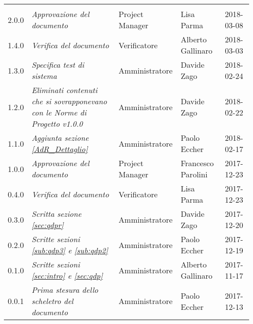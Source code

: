 \newpage 
\section*{}
\begin{table}[H]
	\centering
	\begin{tabular}{C{2cm}|C{4cm}|C{3cm}|C{3cm}|R{2cm}}
		
		 & & & & \\
		

		2.0.0 & \emph{Approvazione del documento} & Project Manager & Lisa Parma & 2018-03-08 \\
		\hline
		
		1.4.0 & \emph{Verifica del documento} & Verificatore &  Alberto Gallinaro & 2018-03-03\\
		\hline
		
		1.3.0 & \emph{Specifica test di sistema} & Amministratore &  Davide Zago & 2018-02-24 \\
		\hline
		
		1.2.0 & \emph{Eliminati contenuti che si sovrapponevano con le Norme di Progetto v1.0.0} & Amministratore &  Davide Zago & 2018-02-22 \\
		\hline
		
		1.1.0 & \emph{Aggiunta sezione \ref{AdR_Dettaglio}} & Amministratore &  Paolo Eccher & 2018-02-17 \\
		\hline
		
		1.0.0 & \emph{Approvazione del documento} & Project Manager &  Francesco Parolini & 2017-12-23 \\
		\hline
		
		0.4.0  & \emph{Verifica del documento} & Verificatore & Lisa Parma & 2017-12-23 \\
		\hline
		
		0.3.0 & \emph{Scritta sezione \ref{sec:qdpr}} & Amministratore & Davide Zago & 2017-12-20 \\
		\hline
		
		0.2.0 & \emph{Scritte sezioni \ref{sub:qdp3} e \ref{sub:qdp2}} &  Amministratore & Paolo Eccher & 2017-12-19 \\
		\hline
		
		0.1.0 & \emph{Scritte sezioni \ref{sec:intro} e \ref{sec:qdp}} & Amministratore & Alberto Gallinaro & 2017-11-17 \\
		\hline
		
		0.0.1 & \emph{Prima stesura dello scheletro del documento} & Amministratore & Paolo Eccher &  2017-12-13 \\
		
	\end{tabular}
	
\end{table}


\clearpage